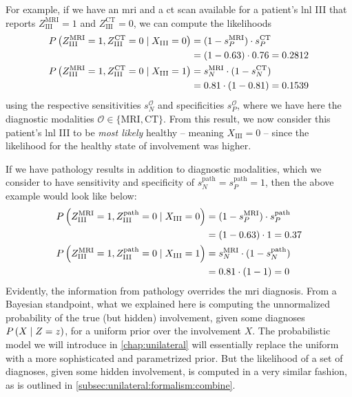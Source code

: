 \documentclass[\relativeRoot/main.tex]{subfiles}
\begin{document}
For example, if we have an \gls{mri} and a \gls{ct} scan available for a patient's \gls{lnl} III that reports $Z_\text{III}^\text{MRI} = 1$ and $Z_\text{III}^\text{CT} = 0$, we can compute the likelihoods
%
\begin{equation}
    \begin{aligned}
        P \left( Z_\text{III}^\text{MRI} = 1, Z_\text{III}^\text{CT} = 0 \mid X_\text{III} = 0 \right)
        &= (1 - s^\text{MRI}_P) \cdot s^\text{CT}_P \\
        &= (1 - 0.63) \cdot 0.76 = 0.2812 \\
        P \left( Z_\text{III}^\text{MRI} = 1, Z_\text{III}^\text{CT} = 0 \mid X_\text{III} = 1 \right)
        &= s^\text{MRI}_N \cdot (1 - s^\text{CT}_N) \\
        &= 0.81 \cdot (1 - 0.81) = 0.1539
    \end{aligned}
\end{equation}
%
using the respective sensitivities $s_N^\mathcal{O}$ and specificities $s_P^\mathcal{O}$, where we have here the diagnostic modalities $\mathcal{O} \in \{ \text{MRI}, \text{CT} \}$. From this result, we now consider this patient's \gls{lnl} III to be \emph{most likely} healthy -- meaning $X_\text{III} = 0$ -- since the likelihood for the healthy state of involvement was higher.

If we have pathology results in addition to diagnostic modalities, which we consider to have sensitivity and specificity of $s^\text{path}_N = s^\text{path}_P = 1$, then the above example would look like below:
%
\begin{equation}
    \begin{aligned}
        P \left( Z_\text{III}^\text{MRI} = 1, Z_\text{III}^\text{path} = 0 \mid X_\text{III} = 0 \right)
        &= (1 - s^\text{MRI}_P) \cdot s^\text{path}_P \\
        &= (1 - 0.63) \cdot 1 = 0.37 \\
        P \left( Z_\text{III}^\text{MRI} = 1, Z_\text{III}^\text{path} = 0 \mid X_\text{III} = 1 \right)
        &= s^\text{MRI}_N \cdot (1 - s^\text{path}_N) \\
        &= 0.81 \cdot (1 - 1) = 0
    \end{aligned}
\end{equation}
%
Evidently, the information from pathology overrides the \gls{mri} diagnosis. From a Bayesian standpoint, what we explained here is computing the unnormalized probability of the true (but hidden) involvement, given some diagnoses $P \left( X \mid Z=z \right)$, for a uniform prior over the involvement $X$. The probabilistic model we will introduce in \cref{chap:unilateral} will essentially replace the uniform with a more sophisticated and parametrized prior. But the likelihood of a set of diagnoses, given some hidden involvement, is computed in a very similar fashion, as is outlined in \cref{subsec:unilateral:formalism:combine}. 
\end{document}
